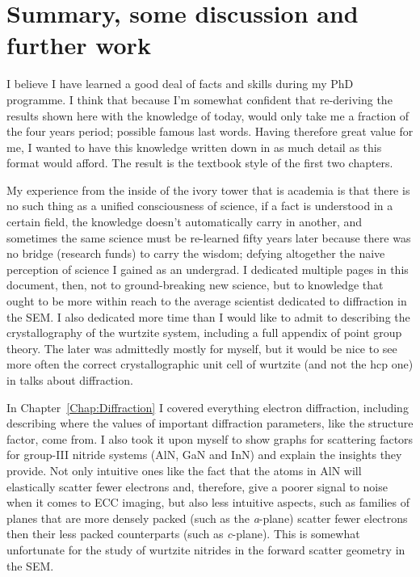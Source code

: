 \chapter{Summary, some discussion and further work}
\label{chap:Conclusion}


I believe I have learned a good deal of facts and skills during my PhD programme. I think that because I'm somewhat confident that re-deriving the results shown here with the knowledge of today, would only take me a fraction of the four years period; possible famous last words. Having therefore great value for me, I wanted to have this knowledge written down in as much detail as this format would afford. The result is the textbook style of the first two chapters. 

My experience from the inside of the ivory tower that is academia is that there is no such thing as a unified consciousness of science, if a fact is understood in a certain field, the knowledge doesn't automatically carry in another, and sometimes the same science must be re-learned fifty years later because there was no bridge (research funds) to carry the wisdom; defying altogether the naive perception of science I gained as an undergrad. I dedicated multiple pages in this document, then, not to ground-breaking new science, but to knowledge that ought to be more within reach to the average scientist dedicated to diffraction in the SEM. I also dedicated more time than I would like to admit to describing the crystallography of the wurtzite system, including a full appendix of point group theory. The later was admittedly mostly for myself, but it would be nice to see more often the correct crystallographic unit cell of wurtzite (and not the hcp one) in talks about diffraction. 

In Chapter~\ref{Chap:Diffraction} I covered  everything electron diffraction, including describing where the values of important diffraction parameters, like the structure factor, come from.  I also took it upon myself to show graphs for scattering factors for group-III nitride systems (AlN, GaN and InN) and explain the insights they provide. Not only intuitive ones like the fact that the atoms in AlN will elastically scatter fewer electrons and, therefore, give a poorer signal to noise when it comes to ECC imaging, but also less intuitive aspects, such as families of planes that are more densely packed (such as the \textit{a}-plane) scatter fewer electrons then their less packed counterparts (such as \textit{c}-plane). This is somewhat unfortunate for the study of \hkl[001] wurtzite nitrides in the forward scatter geometry in the SEM. 

